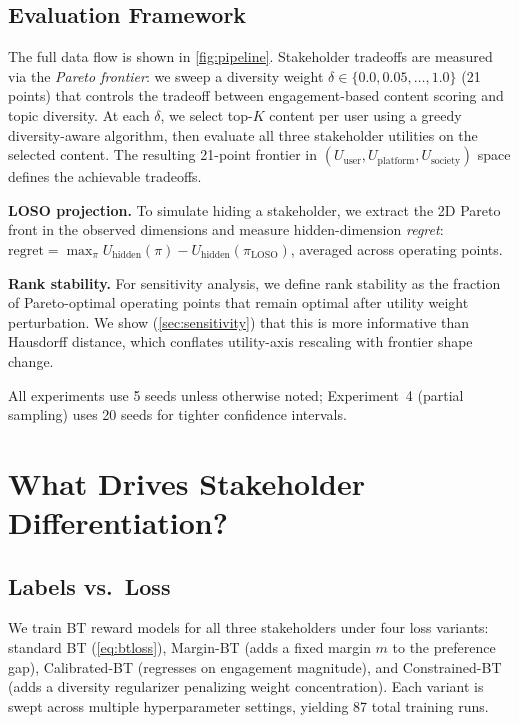 \documentclass[11pt,letterpaper]{article}
\newcommand{\numexp}{87}
\begin{document}
\subsection{Evaluation Framework}
\label{sec:evalframework}

The full data flow is shown in \cref{fig:pipeline}.
Stakeholder tradeoffs are measured via the \emph{Pareto frontier}: we
sweep a diversity weight $\delta \in \{0.0, 0.05, \ldots, 1.0\}$ (21
points) that controls the tradeoff between engagement-based content
scoring and topic diversity. At each $\delta$, we select top-$K$
content per user using a greedy diversity-aware algorithm, then
evaluate all three stakeholder utilities on the selected content. The
resulting 21-point frontier in $(U_{\text{user}},
U_{\text{platform}}, U_{\text{society}})$ space defines the
achievable tradeoffs.

\textbf{LOSO projection.} To simulate hiding a stakeholder, we
extract the 2D Pareto front in the observed dimensions and measure
hidden-dimension \emph{regret}:
$\text{regret} = \max_\pi U_{\text{hidden}}(\pi) - U_{\text{hidden}}(\pi_{\text{LOSO}})$,
averaged across operating points.

\textbf{Rank stability.} For sensitivity analysis, we define rank
stability as the fraction of Pareto-optimal operating points that
remain optimal after utility weight perturbation. We show
(\cref{sec:sensitivity}) that this is more informative than Hausdorff
distance, which conflates utility-axis rescaling with frontier shape
change.

All experiments use 5 seeds unless otherwise noted; Experiment~4
(partial sampling) uses 20 seeds for tighter confidence intervals.

\section{What Drives Stakeholder Differentiation?}
\label{sec:identifiability}

\subsection{Labels vs.\ Loss}

We train BT reward models for all three stakeholders under four loss
variants: standard BT (\cref{eq:btloss}), Margin-BT (adds a fixed
margin $m$ to the preference gap), Calibrated-BT (regresses on
engagement magnitude), and Constrained-BT (adds a diversity
regularizer penalizing weight concentration). Each variant is swept
across multiple hyperparameter settings, yielding \numexp{} total
training runs.
\end{document}
